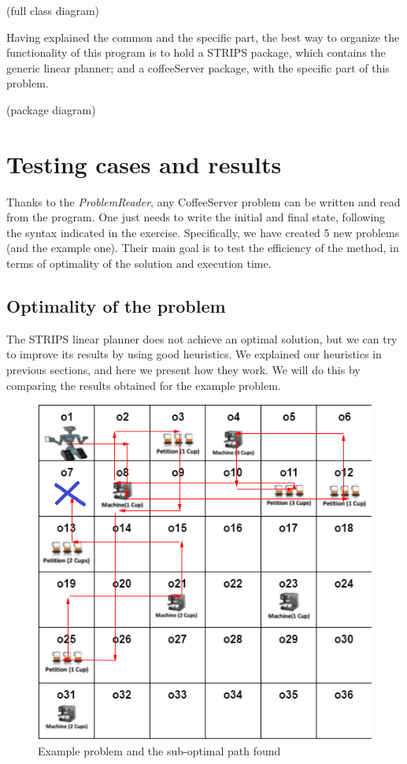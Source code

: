 \documentclass[12pt,a4paper,oneside]{article}
\numberwithin{equation}{section}
\numberwithin{equation}{section}
\theoremstyle{definition}
\begin{document}
(full class diagram)

Having explained the common and the specific part, the best way to organize the functionality of this program is to hold a STRIPS package, which contains the generic linear planner; and a coffeeServer package, with the specific part of this problem.

(package diagram)

\section{Testing cases and results}
Thanks to the \textit{ProblemReader}, any CoffeeServer problem can be written and read from the program. One just needs to write the initial and final state, following the syntax indicated in the exercise. Specifically, we have created 5 new problems (and the example one). Their main goal is to test the efficiency of the method, in terms of optimality of the solution and execution time.

\subsection{Optimality of the problem}
The STRIPS linear planner does not achieve an optimal solution, but we can try to improve its results by using good heuristics. We explained our heuristics in previous sections, and here we present how they work. We will do this by comparing the results obtained for the example problem.

\begin{figure}[!h]
	\centering
	\includegraphics[scale=0.7]{figures/example_problem.png}
	\caption{Example problem and the sub-optimal path found}
	\label{example_optimality} 
\end{figure}
\end{document}

